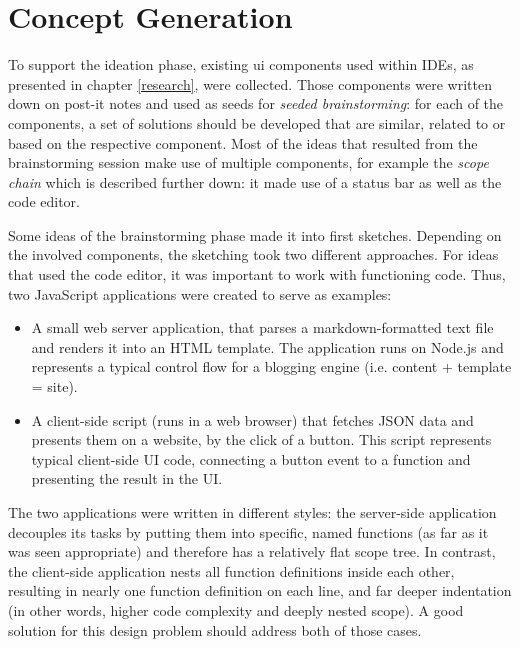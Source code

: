\section{Concept Generation}\label{concept-generation}

To support the ideation phase, existing \ac{ui} components used within
IDEs, as presented in chapter \ref{research}, were collected. Those
components were written down on post-it notes and used as seeds for
\emph{seeded brainstorming}: for each of the components, a set of
solutions should be developed that are similar, related to or based on
the respective component. Most of the ideas that resulted from the
brainstorming session make use of multiple components, for example the
\emph{scope chain} which is described further down: it made use of a
status bar as well as the code editor.

Some ideas of the brainstorming phase made it into first sketches.
Depending on the involved components, the sketching took two different
approaches. For ideas that used the code editor, it was important to
work with functioning code. Thus, two JavaScript applications were
created to serve as examples:

\begin{itemize}
\itemsep1pt\parskip0pt
\item
  A small web server application, that parses a markdown-formatted text
  file and renders it into an HTML template. The application runs on
  Node.js and represents a typical control flow for a blogging engine
  (i.e. content + template = site).
\item
  A client-side script (runs in a web browser) that fetches JSON data
  and presents them on a website, by the click of a button. This script
  represents typical client-side UI code, connecting a button event to a
  function and presenting the result in the UI.
\end{itemize}

The two applications were written in different styles: the server-side
application decouples its tasks by putting them into specific, named
functions (as far as it was seen appropriate) and therefore has a
relatively flat scope tree. In contrast, the client-side application
nests all function definitions inside each other, resulting in nearly
one function definition on each line, and far deeper indentation (in
other words, higher code complexity and deeply nested scope). A good
solution for this design problem should address both of those cases.

